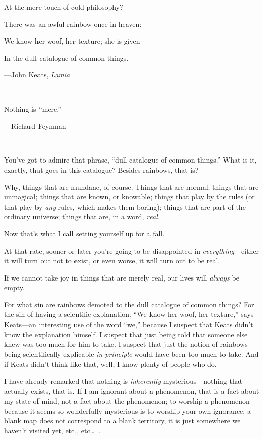 {
 At the mere touch of cold philosophy?}

{
 There was an awful rainbow once in heaven:}

{
 We know her woof, her texture; she is given}

{
 In the dull catalogue of common things.}

{\raggedleft
 {}---John Keats, \textit{Lamia}
\par}


\bigskip

{
 ~}

{
 Nothing is ``mere.''}

{\raggedleft
 {}---Richard Feynman
\par}


\bigskip

{
 ~}

{
 You've got to admire that phrase,
``dull catalogue of common things.''
What is it, exactly, that goes in this catalogue? Besides rainbows,
that is?}

{
 Why, things that are mundane, of course. Things that are normal;
things that are unmagical; things that are known, or knowable; things
that play by the rules (or that play by \textit{any} rules, which makes
them boring); things that are part of the ordinary universe; things
that are, in a word, \textit{real.}}

{
 Now that's what I call setting yourself up for a
fall.}

{
 At that rate, sooner or later you're going to be
disappointed in \textit{everything}{}---either it will turn out not to
exist, or even worse, it will turn out to be real.}

{
 If we cannot take joy in things that are merely real, our lives
will \textit{always} be empty.}

{
 For what sin are rainbows demoted to the dull catalogue of common
things? For the sin of having a scientific explanation.
``We know her woof, her texture,''
says Keats---an interesting use of the word
``we,'' because I suspect that Keats
didn't know the explanation himself. I suspect that
just being told that someone else knew was too much for him to take. I
suspect that just the notion of rainbows being scientifically
explicable \textit{in principle} would have been too much to take. And
if Keats didn't think like that, well, I know plenty of
people who do.}

{
 I have already remarked that nothing is \textit{inherently}
mysterious---nothing that actually exists, that is. If I am ignorant
about a phenomenon, that is a fact about my state of mind, not a fact
about the phenomenon; to worship a phenomenon because it seems so
wonderfully mysterious is to worship your own ignorance; a blank map
does not correspond to a blank territory, it is just somewhere we
haven't visited yet, etc., etc\ldots~.}

